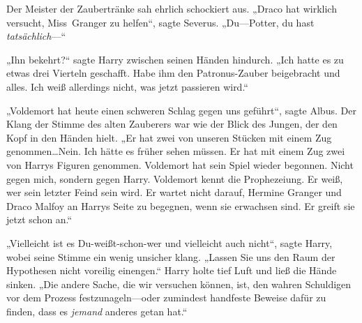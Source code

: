 Der Meister der Zaubertränke sah ehrlich schockiert aus. „Draco hat wirklich versucht, Miss~Granger zu helfen“, sagte Severus. „Du—Potter, du hast \emph{tatsächlich}—“

„Ihn bekehrt?“ sagte Harry zwischen seinen Händen hindurch. „Ich hatte es zu etwas drei Vierteln geschafft. Habe ihm den Patronus-Zauber beigebracht und alles. Ich weiß allerdings nicht, was jetzt passieren wird.“

„Voldemort hat heute einen schweren Schlag gegen uns geführt“, sagte Albus. Der Klang der Stimme des alten Zauberers war wie der Blick des Jungen, der den Kopf in den Händen hielt. „Er hat zwei von unseren Stücken mit einem Zug genommen…Nein. Ich hätte es früher sehen müssen. Er hat mit einem Zug zwei von Harrys Figuren genommen. Voldemort hat sein Spiel wieder begonnen. Nicht gegen mich, sondern gegen Harry. Voldemort kennt die Prophezeiung. Er weiß, wer sein letzter Feind sein wird. Er wartet nicht darauf, Hermine Granger und Draco Malfoy an Harrys Seite zu begegnen, wenn sie erwachsen sind. Er greift sie jetzt schon an.“

„Vielleicht ist es Du-weißt-schon-wer und vielleicht auch nicht“, sagte Harry, wobei seine Stimme ein wenig unsicher klang. „Lassen Sie uns den Raum der Hypothesen nicht voreilig einengen.“ Harry holte tief Luft und ließ die Hände sinken. „Die andere Sache, die wir versuchen können, ist, den wahren Schuldigen vor dem Prozess festzunageln—oder zumindest handfeste Beweise dafür zu finden, dass es \emph{jemand} anderes getan hat.“

